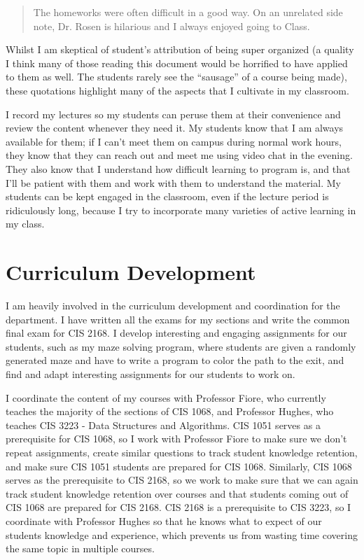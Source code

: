 \documentclass[10pt]{article}
\begin{document}
\begin{small}
\begin{quotation}
\end{quotation}

\begin{quotation}
	The homeworks were often difficult in a good way. On an unrelated side note, Dr. Rosen is hilarious and I always enjoyed going to Class.
\end{quotation}

\end{small}


Whilst I am skeptical of student's attribution of being super organized (a quality I think many of those reading this document would be horrified to have applied to them as well.  The students rarely see the ``sausage'' of a course being made), these quotations highlight many of the aspects that I cultivate in my classroom.  


I record my lectures so my students can peruse them at their convenience and review the content whenever they need it.  
My students know that I am always available for them; if I can't meet them on campus during normal work hours, they know that they can reach out and meet me using video chat in the evening.
They also know that I understand how difficult learning to program is, and that I'll be patient with them and work with them to understand the material.
My students can be kept engaged in the classroom, even if the lecture period is ridiculously long, because I try to incorporate many varieties of active learning in my class.



\section{Curriculum Development}
I am heavily involved in the curriculum development and coordination for the department.
I have written all the exams for my sections and write the common final exam for CIS 2168. 
I develop interesting and engaging assignments for our students, such as my maze solving program, where students are given a randomly generated maze and have to write a program to color the path to the exit, and find and adapt interesting assignments for our students to work on.

I coordinate the content of my courses with Professor Fiore, who currently teaches the majority of the sections of CIS 1068, and Professor Hughes, who teaches CIS 3223 - Data Structures and Algorithms.
CIS 1051 serves as a prerequisite for CIS 1068, so I work with Professor Fiore to make sure we don't repeat assignments, create similar questions to track student knowledge retention, and make sure CIS 1051 students are prepared for CIS 1068.  Similarly, CIS 1068 serves as the prerequisite to CIS 2168, so we work to make sure that we can again track student knowledge retention over courses and that students coming out of CIS 1068 are prepared for CIS 2168.  
CIS 2168 is a prerequisite to CIS 3223, so I coordinate with Professor Hughes so that he knows what to expect of our students knowledge and experience, which prevents us from wasting time covering the same topic in multiple courses.
\end{document}
